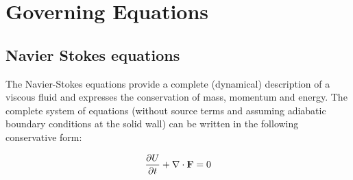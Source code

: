 
\section{Governing Equations}
\label{sec:govEq}
\subsection{Navier Stokes equations}

The Navier-Stokes\cite{Landau1993} equations provide a complete (dynamical) description of a viscous fluid and expresses the conservation of mass, momentum and energy. The complete system of equations (without source terms and assuming adiabatic boundary conditions at the solid wall) can be written in the following conservative form:

\begin{equation}
\frac{\partial U}{\partial t} +  \nabla \cdot {\bf F} = 0
\end{equation}

